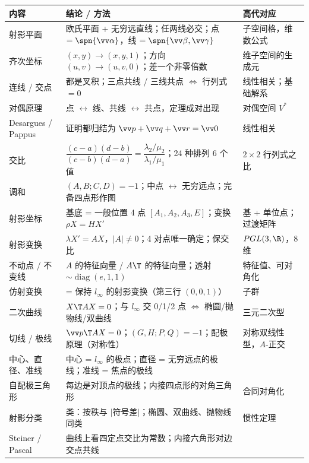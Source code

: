 \clearpage
{}

\begin{center}
\renewcommand{\arraystretch}{1.35}
\begin{tabularx}{\linewidth}{@{}>{\raggedright\arraybackslash}p{2.3cm}>{\raggedright\arraybackslash}X>{\raggedright\arraybackslash}p{3.6cm}@{}}
\toprule
\textbf{\sffamily 内容} & \textbf{\sffamily 结论 / 方法} & \textbf{\sffamily 高代对应}\\\midrule
射影平面 & 欧氏平面 + 无穷远直线；任两线必交；点 $=\spn{\vv\alpha}$，线 $=\spn{\vv\beta,\vv\gamma}$ & 子空间格，维数公式\\
齐次坐标 & $(x,y)\to(x,y,1)$；方向 $(u,v)\to(u,v,0)$；差一个非零倍数 & 1 维子空间的生成元\\
连线 / 交点 & 都是叉积；三点共线 / 三线共点 $\iff$ 行列式 $=0$ & 线性相关；基础解系\\
对偶原理 & 点 $\leftrightarrow$ 线、共线 $\leftrightarrow$ 共点，定理成对出现 & 对偶空间 $V^*$\\
Desargues / Pappus & 证明都归结为 $\vv p+\vv q+\vv r=\vv0$ & 线性相关\\
交比 & $\dfrac{(c-a)(d-b)}{(c-b)(d-a)}=\dfrac{\lambda_2/\mu_2}{\lambda_1/\mu_1}$；24 种排列 6 个值 & $2\times2$ 行列式之比\\
调和 & $(A,B;C,D)=-1$；中点 $\leftrightarrow$ 无穷远点；完备四点形作图 & \\
射影坐标 & 基底 = 一般位置 4 点 $[A_1,A_2,A_3,E]$；变换 $\rho X=HX'$ & 基 + 单位点；过渡矩阵\\
射影变换 & $\lambda X'=AX$，$|A|\ne0$；4 对点唯一确定；保交比 & $PGL(3,\R)$，8 维\\
不动点 / 不变线 & $A$ 的特征向量 / $A\T$ 的特征向量；透射 $\sim\operatorname{diag}(e,1,1)$ & 特征值、可对角化\\
仿射变换 & = 保持 $l_\infty$ 的射影变换（第三行 $(0,0,1)$） & 子群\\
二次曲线 & $X\T AX=0$；与 $l_\infty$ 交 0/1/2 点 $\iff$ 椭圆/抛物线/双曲线 & 三元二次型\\
切线 / 极线 & $\vv p\T AX=0$；$(G,H;P,Q)=-1$；配极原理（对称性） & 对称双线性型，$A$-正交\\
中心、直径、准线 & 中心 = $l_\infty$ 的极点；直径 = 无穷远点的极线；准线 = 焦点的极线 & \\
自配极三角形 & 每边是对顶点的极线；内接四点形的对角三角形 & 合同对角化\\
射影分类 & 5 类：按秩与 $|$符号差$|$；椭圆、双曲线、抛物线同类 & 惯性定理\\
Steiner / Pascal & 曲线上看四定点交比为常数；内接六角形对边交点共线 & \\\bottomrule
\end{tabularx}
\end{center}


